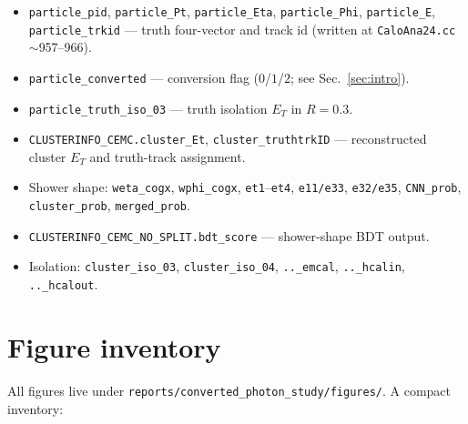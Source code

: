 \documentclass[11pt,a4paper]{article}
\begin{document}
\begin{itemize}
  \item \texttt{particle\_pid}, \texttt{particle\_Pt}, \texttt{particle\_Eta},
    \texttt{particle\_Phi}, \texttt{particle\_E}, \texttt{particle\_trkid}
    --- truth four-vector and track id (written at
    \texttt{CaloAna24.cc} $\sim$957--966).
  \item \texttt{particle\_converted} --- conversion flag
    ($0$/$1$/$2$; see Sec.~\ref{sec:intro}).
  \item \texttt{particle\_truth\_iso\_03} --- truth isolation $E_T$ in $R=0.3$.
  \item \texttt{CLUSTERINFO\_CEMC.cluster\_Et},
    \texttt{cluster\_truthtrkID} --- reconstructed cluster $E_T$ and
    truth-track assignment.
  \item Shower shape: \texttt{weta\_cogx}, \texttt{wphi\_cogx},
    \texttt{et1}--\texttt{et4}, \texttt{e11/e33}, \texttt{e32/e35},
    \texttt{CNN\_prob}, \texttt{cluster\_prob}, \texttt{merged\_prob}.
  \item \texttt{CLUSTERINFO\_CEMC\_NO\_SPLIT.bdt\_score} --- shower-shape BDT
    output.
  \item Isolation: \texttt{cluster\_iso\_03}, \texttt{cluster\_iso\_04},
    \texttt{..\_emcal}, \texttt{..\_hcalin}, \texttt{..\_hcalout}.
\end{itemize}

\section{Figure inventory}
\label{app:figure_inventory}

All figures live under
\texttt{reports/converted\_photon\_study/figures/}. A compact inventory:
\end{document}
